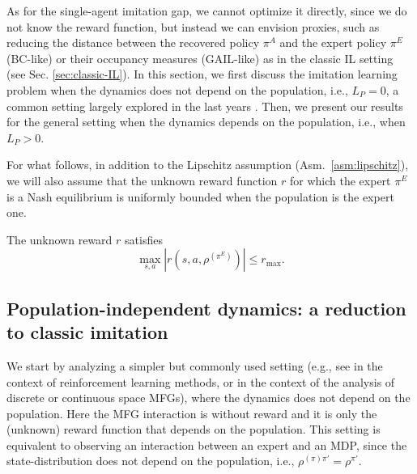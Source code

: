 \documentclass{article}
\begin{document}
As for the single-agent imitation gap, we cannot optimize it directly, since we do not know the reward function, but instead we can envision proxies, such as reducing the distance between the recovered policy $\pi^A$ and the expert policy $\pi^E$ (BC-like) or their occupancy measures (GAIL-like) as in the classic IL setting (see Sec. \ref{sec:classic-IL}). 
In this section, we first discuss the imitation learning problem when the dynamics does not depend on the population, i.e., $L_P=0$, a common setting largely explored in the last years \cite{perolat2022scaling,perrin2020fictitious}. 
Then, we present our results for the general setting when the dynamics depends on the population, i.e., when $L_P > 0$.

For what follows, in addition to the Lipschitz assumption (Asm.~\ref{asm:lipschitz}), we will also assume that the unknown reward function $r$ for which the expert $\pi^E$ is a Nash equilibrium is uniformly bounded when the population is the expert one.

\begin{assumption}
    \label{asm:reward}
   The unknown reward $r$ satisfies
    \begin{equation}
        \max_{s,a}|r(s,a,\rho^{(\pi^E)})|\leq r_\text{max}.
    \end{equation}
\end{assumption}


\subsection{Population-independent dynamics: a reduction to classic imitation}\label{sec:pop-independent}

We start by analyzing a simpler but commonly used setting (e.g., see \cite{perrin2020fictitious} in the context of reinforcement learning methods, or \cite{gomes2010discrete,cardaliaguet2015mean,achdou2019mean} in the context of the analysis of discrete or continuous space MFGs), where the dynamics does not depend on the population. 
Here the MFG interaction is without reward and it is only the (unknown) reward function that depends on the population. 
This setting is equivalent to observing an interaction between an expert and an MDP, since the state-distribution does not depend on the population, i.e., $\rho^{(\pi)\pi'}=\rho^{\pi'}$.
\end{document}
